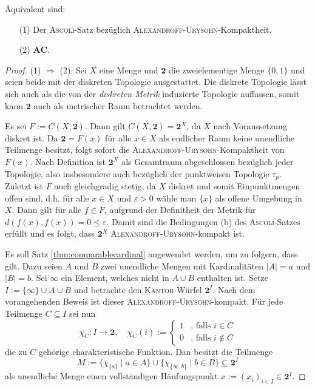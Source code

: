 \begin{thm}
  Äquivalent sind:
  \begin{enumerate}
    \item[(1)] Der \textsc{Ascoli}-Satz bezüglich \textsc{Alexandroff}\hyp{}\textsc{Urysohn}\hyp{}Kompaktheit.
    \item[(2)] $\mathbf{AC}$.
  \end{enumerate}
\end{thm}

\begin{proof}
  (1) $\Rightarrow$ (2): Sei $X$ eine Menge und $\mathbf{2}$ die zweielementige Menge $\{0,1\}$ und seien beide mit der diskreten Topologie ausgestattet. 
  Die diskrete Topologie lässt sich auch als die von der \textit{diskreten Metrik} induzierte Topologie auffassen, somit kann $\mathbf{2}$ auch als metrischer Raum betrachtet werden. 

  Es sei $F := C(X, \mathbf{2})$.
  Dann gilt $C(X, \mathbf{2}) = \mathbf{2}^X$, da $X$ nach Voraussetzung diskret ist.
  Da $\mathbf{2} = F(x)$ für alle $x \in X$ als endlicher Raum keine unendliche Teilmenge besitzt, folgt sofort die \textsc{Alexandroff}\hyp{}\textsc{Urysohn}\hyp{}Kompaktheit von $F(x)$.
  Nach Definition ist $\mathbf{2}^X$ als Gesamtraum abgeschlossen bezüglich jeder Topologie, also insbesondere auch bezüglich der punktweisen Topologie $\tau_p$.
  Zuletzt ist $F$ auch gleichgradig stetig, da $X$ diskret und somit Einpunktmengen offen sind, d.h. für alle $x \in X$ und $\varepsilon > 0$ wähle man $\{x\}$ als offene Umgebung in $X$. 
  Dann gilt für alle $f \in F$, aufgrund der Definitheit der Metrik für  $d(f(x),f(x)) = 0 \leq \varepsilon$.
  Damit sind die Bedingungen (b) des \textsc{Ascoli}\hyp{}Satzes erfüllt und es folgt, dass $\mathbf{2}^X$ \textsc{Alexandroff}\hyp{}\textsc{Urysohn}\hyp{}kompakt ist. 

  Es soll Satz \ref{thm:comparablecardinal} angewendet werden, um zu folgern, dass \AC gilt.
  Dazu seien $A$ und $B$ zwei unendliche Mengen mit Kardinalitäten $|A| = a$ und $|B| = b$.
  Sei $\infty$ ein Element, welches nicht in $A \cup B$ enthalten ist.
  Setze $I := \{\infty\} \cup A \cup B$ und betrachte den \textsc{Kantor}\hyp{}Würfel $\mathbf{2}^I$.
  Nach dem vorangehenden Beweis ist dieser \textsc{Alexandroff}\hyp{}\textsc{Urysohn}\hyp{}kompakt.
  Für jede Teilmenge $C \subseteq I$ sei nun 
  \begin{equation}
    \chi_C \colon I \to \mathbf{2}, \quad
    \chi_C(i) := 
    \begin{cases}
      1 &\text{, falls } i \in C \\
      0 &\text{, falls } i \not\in C
    \end{cases}
  \end{equation}
  die zu $C$ gehörige charakteristische Funktion.
  Dan besitzt die Teilmenge
  \begin{displaymath}
    M := \{\chi_{\{a\}} \mid a \in A\} \cup \{\chi_{\{\infty,b\}} \mid b \in B\} \subseteq \mathbf{2}^I
  \end{displaymath}
  als unendliche Menge einen vollständigen Häufungspunkt $x := (x_i)_{i \in I} \in \mathbf{2}^I$.


\end{proof}

